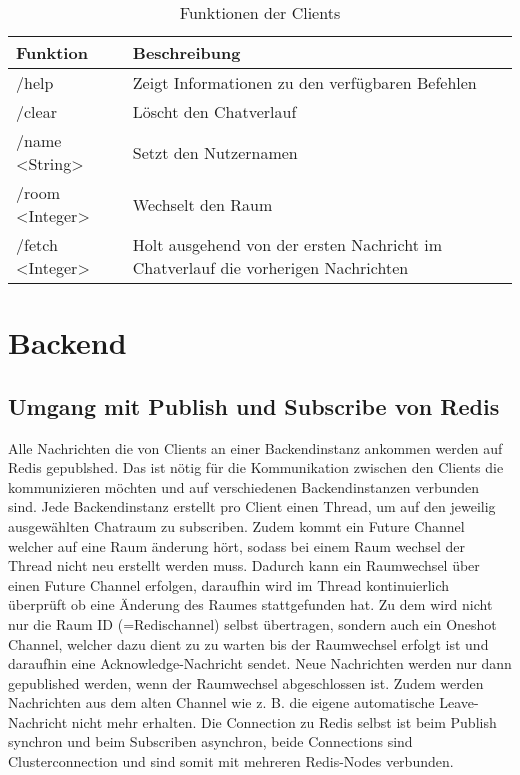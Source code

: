 \begin{table}[h!]
\begin{center}
\begin{tabular}{ | l | m{10cm} | }
\hline
\textbf{Funktion} & \textbf{Beschreibung} \\ 
\hline
/help & Zeigt Informationen zu den verfügbaren Befehlen \\ 
\hline
/clear & Löscht den Chatverlauf \\ 
\hline
/name <String> & Setzt den Nutzernamen \\ 
\hline
/room <Integer> & Wechselt den Raum \\ 
\hline
/fetch <Integer> & Holt ausgehend von der ersten Nachricht im Chatverlauf die vorherigen Nachrichten \\ 
\hline
\end{tabular}
\end{center}
\caption{Funktionen der Clients}
\label{tab:clientcommands}
\end{table}

\section{Backend}
\subsection{Umgang mit Publish und Subscribe von Redis}
Alle Nachrichten die von Clients an einer Backendinstanz ankommen werden auf Redis gepublshed.
Das ist nötig für die Kommunikation zwischen den Clients die kommunizieren möchten und auf verschiedenen Backendinstanzen verbunden sind.
Jede Backendinstanz erstellt pro Client einen Thread, um auf den jeweilig ausgewählten Chatraum zu subscriben.
Zudem kommt ein Future Channel welcher auf eine Raum änderung hört, sodass bei einem Raum wechsel der Thread nicht neu erstellt werden muss.
Dadurch kann ein Raumwechsel über einen Future Channel erfolgen, daraufhin wird im Thread kontinuierlich überprüft ob eine Änderung des Raumes stattgefunden hat.
Zu dem wird nicht nur die Raum ID (=Redischannel) selbst übertragen, sondern auch ein Oneshot Channel, welcher dazu dient zu zu warten bis der Raumwechsel erfolgt ist und daraufhin eine Acknowledge-Nachricht sendet.
Neue Nachrichten werden nur dann gepublished werden, wenn der Raumwechsel abgeschlossen ist.
Zudem werden Nachrichten aus dem alten Channel wie z. B. die eigene automatische Leave-Nachricht nicht mehr erhalten.
Die Connection zu Redis selbst ist beim Publish synchron und beim Subscriben asynchron, beide Connections sind Clusterconnection und sind somit mit mehreren Redis-Nodes verbunden.

